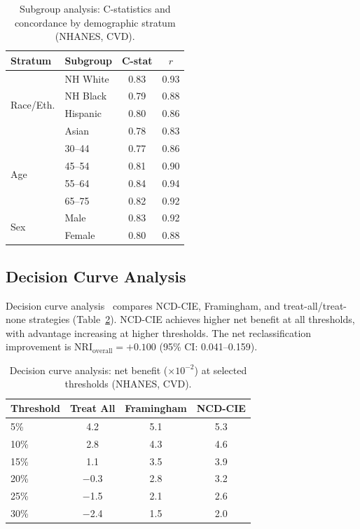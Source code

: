 \documentclass[runningheads]{llncs}
\begin{document}
\begin{table}[t]
\centering
\caption{Subgroup analysis: C-statistics and concordance by
demographic stratum (NHANES, CVD).}
\label{tab:subgroup}
\small
\begin{tabular}{@{}llcc@{}}
\toprule
\textbf{Stratum} & \textbf{Subgroup} & \textbf{C-stat} & \textbf{$r$} \\
\midrule
\multirow{4}{*}{Race/Eth.}
  & NH White  & 0.83 & 0.93 \\
  & NH Black  & 0.79 & 0.88 \\
  & Hispanic  & 0.80 & 0.86 \\
  & Asian     & 0.78 & 0.83 \\
\midrule
\multirow{4}{*}{Age}
  & 30--44    & 0.77 & 0.86 \\
  & 45--54    & 0.81 & 0.90 \\
  & 55--64    & 0.84 & 0.94 \\
  & 65--75    & 0.82 & 0.92 \\
\midrule
\multirow{2}{*}{Sex}
  & Male      & 0.83 & 0.92 \\
  & Female    & 0.80 & 0.88 \\
\bottomrule
\end{tabular}
\end{table}

\subsection{Decision Curve Analysis}\label{sec:dca}

Decision curve analysis~\cite{vickers2006dca} compares NCD-CIE,
Framingham, and treat-all/treat-none strategies
(Table~\ref{tab:dca}).  NCD-CIE achieves higher net benefit at all
thresholds, with advantage increasing at higher thresholds.  The
net reclassification improvement is $\text{NRI}_{\text{overall}} =
+0.100$ (95\% CI: 0.041--0.159).

\begin{table}[t]
\centering
\caption{Decision curve analysis: net benefit ($\times 10^{-2}$) at
selected thresholds (NHANES, CVD).}
\label{tab:dca}
\small
\begin{tabular}{@{}lccc@{}}
\toprule
\textbf{Threshold} & \textbf{Treat All} & \textbf{Framingham} &
\textbf{NCD-CIE} \\
\midrule
5\%  & 4.2 & 5.1 & 5.3 \\
10\% & 2.8 & 4.3 & 4.6 \\
15\% & 1.1 & 3.5 & 3.9 \\
20\% & $-$0.3 & 2.8 & 3.2 \\
25\% & $-$1.5 & 2.1 & 2.6 \\
30\% & $-$2.4 & 1.5 & 2.0 \\
\bottomrule
\end{tabular}
\end{table}
\end{document}
